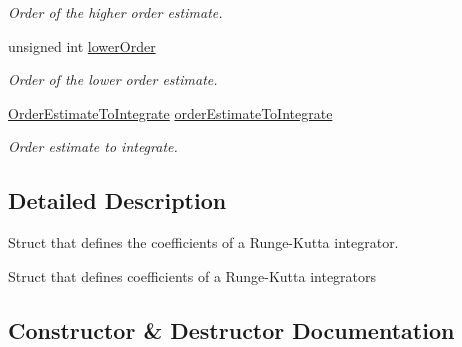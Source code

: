 \begin{DoxyCompactItemize}
\begin{DoxyCompactList}\small\item\em Order of the higher order estimate. \end{DoxyCompactList}\item 
unsigned int \hyperlink{structtudat_1_1numerical__integrators_1_1RungeKuttaCoefficients_a988d19836e8a6310e20a1a905da39459}{lower\+Order}\hypertarget{structtudat_1_1numerical__integrators_1_1RungeKuttaCoefficients_a988d19836e8a6310e20a1a905da39459}{}\label{structtudat_1_1numerical__integrators_1_1RungeKuttaCoefficients_a988d19836e8a6310e20a1a905da39459}

\begin{DoxyCompactList}\small\item\em Order of the lower order estimate. \end{DoxyCompactList}\item 
\hyperlink{structtudat_1_1numerical__integrators_1_1RungeKuttaCoefficients_a97f8cb87fe196aa1f07f2355d0e4f8a3}{Order\+Estimate\+To\+Integrate} \hyperlink{structtudat_1_1numerical__integrators_1_1RungeKuttaCoefficients_ae966d42ae651b1205c4f1bd36589cf6a}{order\+Estimate\+To\+Integrate}\hypertarget{structtudat_1_1numerical__integrators_1_1RungeKuttaCoefficients_ae966d42ae651b1205c4f1bd36589cf6a}{}\label{structtudat_1_1numerical__integrators_1_1RungeKuttaCoefficients_ae966d42ae651b1205c4f1bd36589cf6a}

\begin{DoxyCompactList}\small\item\em Order estimate to integrate. \end{DoxyCompactList}\end{DoxyCompactItemize}


\subsection{Detailed Description}
Struct that defines the coefficients of a Runge-\/\+Kutta integrator. 

Struct that defines coefficients of a Runge-\/\+Kutta integrators 

\subsection{Constructor \& Destructor Documentation}

